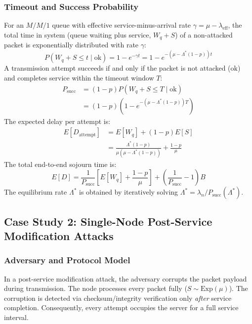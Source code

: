 \documentclass[journal,compsoc]{IEEEtran}
\begin{document}
\subsubsection{Timeout and Success Probability}
For an $M/M/1$ queue with effective service-minus-arrival rate $\gamma = \mu - \lambda_{\text{eff}}$, the total time in system (queue waiting plus service, $W_q + S$) of a non-attacked packet is exponentially distributed with rate $\gamma$:
\begin{equation}
P(W_q + S \le t \mid \text{ok}) = 1 - e^{-\gamma t} = 1 - e^{-(\mu - \Lambda^*(1-p))t}
\end{equation}
A transmission attempt succeeds if and only if the packet is not attacked ($\text{ok}$) and completes service within the timeout window $T$:
\begin{align}
P_{\text{succ}} &= (1 - p) P(W_q + S \le T \mid \text{ok}) \nonumber \\
&= (1 - p)\left(1 - e^{-(\mu - \Lambda^*(1-p))T}\right)
\end{align}
The expected delay per attempt is:
\begin{align}
E[D_{\text{attempt}}] &= E[W_q] + (1 - p) E[S] \nonumber \\
&= \frac{\Lambda^*(1-p)}{\mu(\mu - \Lambda^*(1-p))} + \frac{1-p}{\mu}
\end{align}
The total end-to-end sojourn time is:
\begin{equation}
E[D] = \frac{1}{P_{\text{succ}}} \left[E[W_q] + \frac{1-p}{\mu}\right] + \left(\frac{1}{P_{\text{succ}}} - 1\right) B
\end{equation}
The equilibrium rate $\Lambda^*$ is obtained by iteratively solving $\Lambda^* = \lambda_n / P_{\text{succ}}(\Lambda^*)$.

\subsection{Case Study 2: Single-Node Post-Service Modification Attacks}
\subsubsection{Adversary and Protocol Model}
In a post-service modification attack, the adversary corrupts the packet payload during transmission. The node processes every packet fully ($S \sim \text{Exp}(\mu)$). The corruption is detected via checksum/integrity verification only \textit{after} service completion. Consequently, every attempt occupies the server for a full service interval.
\end{document}
